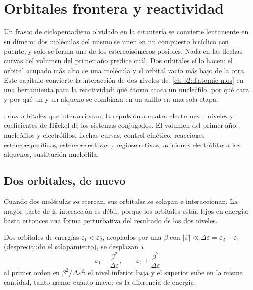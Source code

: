 \chapter{Orbitales frontera y reactividad}\label{ch:b2:frontier-orbitals}

Un frasco de ciclopentadieno olvidado en la estantería se convierte lentamente en su dímero:
dos moléculas del mismo  se unen en un compuesto bicíclico con puente, y
solo se forma uno de los estereoisómeros posibles. Nada en las flechas curvas del
volumen del primer año predice cuál. Dos orbitales sí lo hacen: el orbital ocupado más alto
de una molécula y el orbital vacío más bajo de la otra. Este
capítulo convierte la interacción de dos niveles del \cref{ch:b2:diatomic-mos} en una
herramienta para la reactividad: qué átomo ataca un nucleófilo, por qué cara y
por qué un  y un alqueno se combinan en un anillo en una sola etapa.

\begin{recall}
: dos orbitales que interaccionan, la repulsión a cuatro electrones.
: niveles y coeficientes de Hückel de los sistemas conjugados.
El volumen del primer año: nucleófilos y electrófilos, flechas curvas, control
cinético, reacciones estereoespecíficas, estereoselectivas y regioselectivas,
adiciones electrófilas a los alquenos, sustitución nucleófila.
\end{recall}

\section{Dos orbitales, de nuevo}

Cuando dos moléculas se acercan, sus orbitales se solapan e interaccionan. La mayor parte de la
interacción es débil, porque los orbitales están lejos en energía; basta entonces una forma perturbativa
del resultado de los dos niveles.

\begin{theorem}\label{thm:b2:frontier-orbitals:perturbation}
Dos orbitales de energías $\varepsilon_1 < \varepsilon_2$, acoplados por una 
$\beta$ con $|\beta| \ll \Delta\varepsilon = \varepsilon_2 - \varepsilon_1$ (despreciando el solapamiento), se
desplazan a
\[
  \varepsilon_1 - \frac{\beta^2}{\Delta\varepsilon}, \qquad \varepsilon_2 + \frac{\beta^2}{\Delta\varepsilon}
\]
al primer orden en $\beta^2/\Delta\varepsilon^2$: el nivel inferior baja y el superior sube en la misma
cantidad, tanto menor cuanto mayor es la diferencia de energía.
\end{theorem}

